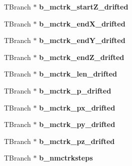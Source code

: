 \begin{DoxyCompactItemize}
\item 
\hypertarget{classanatree_a89ceffbd2ea06618a376c94e8bf854ed}{T\-Branch $\ast$ {\bfseries b\-\_\-mctrk\-\_\-start\-Z\-\_\-drifted}}\label{classanatree_a89ceffbd2ea06618a376c94e8bf854ed}

\item 
\hypertarget{classanatree_a6fa103e1e0c319c9465150c0c3ec5d17}{T\-Branch $\ast$ {\bfseries b\-\_\-mctrk\-\_\-end\-X\-\_\-drifted}}\label{classanatree_a6fa103e1e0c319c9465150c0c3ec5d17}

\item 
\hypertarget{classanatree_a38fde61bf86753f054cc6343e5aa6be6}{T\-Branch $\ast$ {\bfseries b\-\_\-mctrk\-\_\-end\-Y\-\_\-drifted}}\label{classanatree_a38fde61bf86753f054cc6343e5aa6be6}

\item 
\hypertarget{classanatree_af1fcf7b6215f3dbaf4e99e7cbe12734b}{T\-Branch $\ast$ {\bfseries b\-\_\-mctrk\-\_\-end\-Z\-\_\-drifted}}\label{classanatree_af1fcf7b6215f3dbaf4e99e7cbe12734b}

\item 
\hypertarget{classanatree_a6d1199a24e1b1400c575cf1eac6eec91}{T\-Branch $\ast$ {\bfseries b\-\_\-mctrk\-\_\-len\-\_\-drifted}}\label{classanatree_a6d1199a24e1b1400c575cf1eac6eec91}

\item 
\hypertarget{classanatree_a6c668d45a504254bfbb92ad8db78e188}{T\-Branch $\ast$ {\bfseries b\-\_\-mctrk\-\_\-p\-\_\-drifted}}\label{classanatree_a6c668d45a504254bfbb92ad8db78e188}

\item 
\hypertarget{classanatree_ac0be732d980edf31cf39e7ae708880fa}{T\-Branch $\ast$ {\bfseries b\-\_\-mctrk\-\_\-px\-\_\-drifted}}\label{classanatree_ac0be732d980edf31cf39e7ae708880fa}

\item 
\hypertarget{classanatree_a5cf70fe3f5fe63997907c851c6de164f}{T\-Branch $\ast$ {\bfseries b\-\_\-mctrk\-\_\-py\-\_\-drifted}}\label{classanatree_a5cf70fe3f5fe63997907c851c6de164f}

\item 
\hypertarget{classanatree_a9ee6954967b5fb936059238f94861860}{T\-Branch $\ast$ {\bfseries b\-\_\-mctrk\-\_\-pz\-\_\-drifted}}\label{classanatree_a9ee6954967b5fb936059238f94861860}

\item 
\hypertarget{classanatree_ac94a1aab31ead862b37c451c5b51f6f6}{T\-Branch $\ast$ {\bfseries b\-\_\-nmctrksteps}}\label{classanatree_ac94a1aab31ead862b37c451c5b51f6f6}


\end{DoxyCompactItemize}
